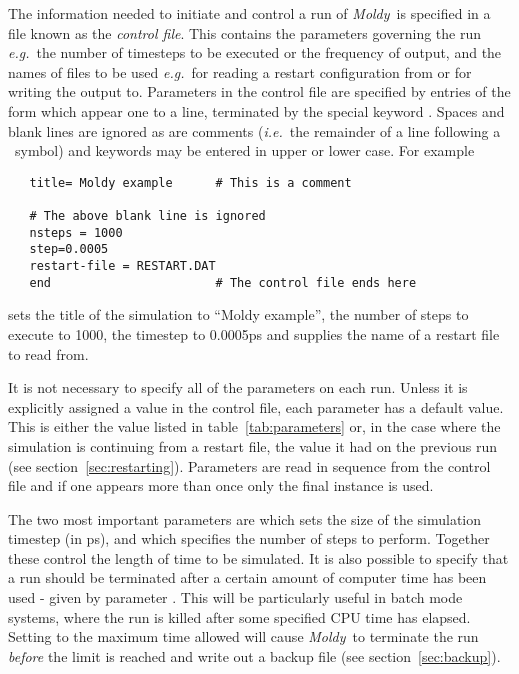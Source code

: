 \documentclass[a4paper,twoside]{report}
\newcommand{\moldy}{\emph{Moldy}}
\newcommand{\eg}{\emph{e.g.}}
\newcommand{\ie}{\emph{i.e.}}
\begin{document}
The information needed to initiate and control a run of \moldy\ is
specified in a file known as the \emph{control file}. This contains
the parameters governing the run \eg\ the number of timesteps to be
executed or the frequency of output, and the names of files to be used
\eg\ for reading a restart configuration from or for writing the
output to. Parameters in the control file are specified by entries of
the form  which appear one to a line,
terminated by the special keyword .  Spaces and blank
lines are ignored as are comments (\ie\ the remainder of a line
following a \Lit{\#}~symbol) and keywords may be entered in upper
or lower case. For example
\begin{verbatim}
   title= Moldy example      # This is a comment

   # The above blank line is ignored
   nsteps = 1000
   step=0.0005
   restart-file = RESTART.DAT
   end                       # The control file ends here
\end{verbatim}
sets the title of the simulation to ``Moldy example'', the number of
steps to execute to 1000, the timestep to 0.0005ps and supplies the
name of a restart file to read from.

It is not necessary to specify all of the parameters on each run.
Unless it is explicitly assigned a value in the control file, each
parameter has a default value.  This is either the value listed in
table~\ref{tab:parameters} or, in the case where the simulation is
continuing from a restart file, the value it had on the previous run
(see section~\ref{sec:restarting}). Parameters are read in sequence
from the control file and if one appears more than once only the final
instance is used.

The two most important parameters are  which sets the
size of the simulation timestep (in ps), and  which
specifies the number of steps to perform.  Together these control the
length of time to be simulated.  It is also possible to specify that a
run should be terminated after a certain amount of computer time has
been used - given by parameter .  This will be
particularly useful in batch mode systems, where the run is killed
after some specified CPU time has elapsed.  Setting 
to the maximum time allowed will cause \moldy\ to terminate the run
\emph{before} the limit is reached and write out a backup file (see
section~\ref{sec:backup}).
\end{document}
